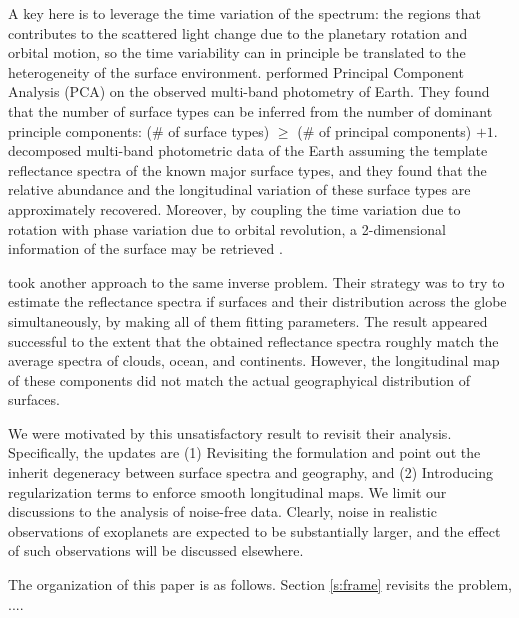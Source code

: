 \documentclass[iop,numberedappendix,apj,]{emulateapj}
\begin{document}
A key here is to leverage the time variation of the spectrum: the regions that contributes to the scattered light change due to the planetary rotation and  orbital motion, so the time variability can in principle be translated to the heterogeneity of the surface environment.  
\citet{Cowan2009, Cowan2011} performed Principal Component Analysis (PCA) on the observed multi-band photometry of Earth. They found that the number of surface types can be inferred from the number of dominant principle components: (\# of surface types) $\ge $ (\# of principal components) $+ 1$. %
\citet{Fujii2010, Fujii2011} decomposed multi-band photometric data of the Earth assuming the template reflectance spectra of the known major surface types, and they found that the relative abundance and the longitudinal variation of these surface types are approximately recovered. 
Moreover, by coupling the time variation due to rotation with phase variation due to orbital revolution, a 2-dimensional information of the surface may be retrieved \citep{Kawahara2010, Kawahara2011, Fujii2012}. 

\citet{Cowan2013} took another approach to the same inverse problem. 
Their strategy was to try to estimate the reflectance spectra if surfaces and their distribution across the globe simultaneously, by making all of them fitting parameters. 
The result appeared successful to the extent that the obtained reflectance spectra roughly match the average spectra of clouds, ocean, and continents. 
However, the longitudinal map of these components did not match the actual geographyical distribution of surfaces. 

We were motivated by this unsatisfactory result to revisit their analysis. 
Specifically, the updates are (1) Revisiting the formulation and point out the inherit degeneracy between surface spectra and geography, and (2) Introducing regularization terms to enforce smooth longitudinal maps. 
We limit our discussions to the analysis of noise-free data. Clearly, noise in realistic observations of exoplanets are expected to be substantially larger, and the effect of such observations will be discussed elsewhere. 

The organization of this paper is as follows. 
Section \ref{s:frame} revisits the problem, ....

\end{document}
